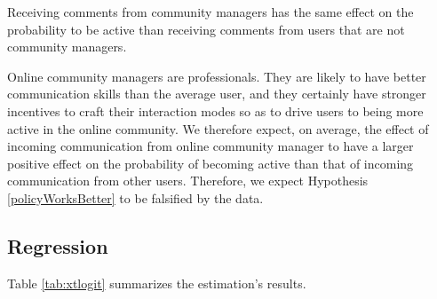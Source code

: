 \begin{policyWorks}
	Receiving comments from community managers has the same effect on the probability to be active than receiving comments from users that are not community managers. 
	\label{policyWorksBetter}
\end{policyWorks}

Online community managers are professionals. They are likely to have better communication skills than the average user, and they certainly have stronger incentives to craft their interaction modes so as to drive users to being more active in the online community. We therefore expect, on average, the effect of incoming communication from online community manager to have a larger positive effect on the probability of becoming active than that of incoming communication from other users. Therefore, we expect Hypothesis \ref{policyWorksBetter} to be falsified by the data. 


\subsection{Regression}

Table \ref{tab:xtlogit} summarizes the estimation's results. 


